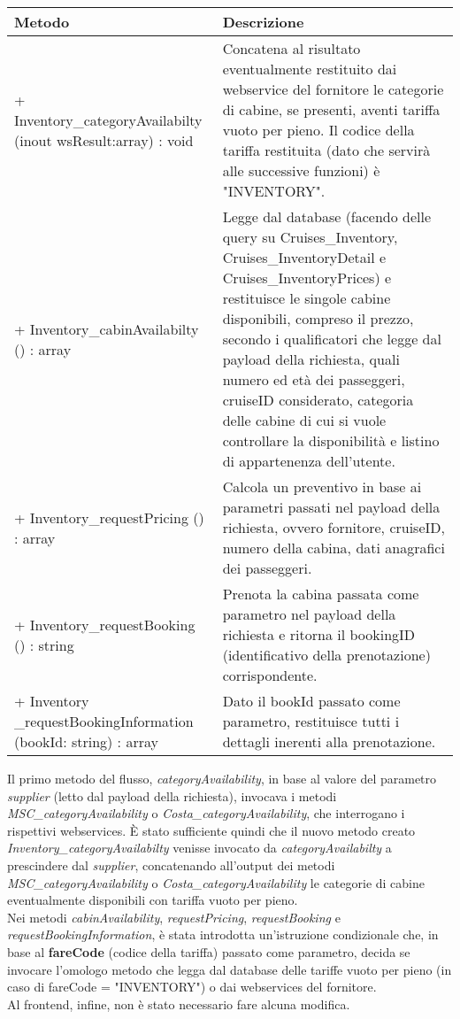 \begin{center}
	\def\arraystretch{1.5}
	\begin{longtable}{ >{\raggedright}p{5.5cm} p{6.8cm}} 
		\hline
		\textbf{Metodo} & \textbf{Descrizione} \\ \hline
		+ Inventory\_categoryAvailabilty (inout wsResult:array) : void & Concatena al risultato eventualmente restituito dai \gls{webservice} del fornitore le categorie di cabine, se presenti, aventi tariffa vuoto per pieno. Il codice della tariffa restituita (dato che servirà alle successive funzioni) è "INVENTORY".\\
		\hline
		+ Inventory\_cabinAvailabilty () : array & Legge dal database (facendo delle query su Cruises\_Inventory, Cruises\_InventoryDetail e Cruises\_InventoryPrices) e restituisce le singole cabine disponibili, compreso il prezzo, secondo i qualificatori che legge dal payload della richiesta, quali numero ed età dei passeggeri, cruiseID considerato, categoria delle cabine di cui si vuole controllare la disponibilità e listino di appartenenza dell'utente.\\
		\hline
		+ Inventory\_requestPricing () : array & Calcola un preventivo in base ai parametri passati nel payload della richiesta, ovvero fornitore, cruiseID, numero della cabina, dati anagrafici dei passeggeri.\\
		\hline
		+ Inventory\_requestBooking () : string & Prenota la cabina passata come parametro nel payload della richiesta e ritorna il bookingID (identificativo della prenotazione) corrispondente.\\
		\hline
		+ Inventory \_requestBookingInformation (bookId: string) : array & Dato il bookId passato come parametro, restituisce tutti i dettagli inerenti alla prenotazione. \\
		\hline
	\end{longtable}
\end{center}
Il primo metodo del flusso, \textit{categoryAvailability}, in base al valore del parametro \textit{supplier} (letto dal payload della richiesta), invocava i metodi \textit{MSC\_categoryAvailability} o \textit{Costa\_categoryAvailability}, che interrogano i rispettivi \glspl{webservice}. È stato sufficiente quindi che il nuovo metodo creato \textit{Inventory\_categoryAvailabilty} venisse invocato da \textit{categoryAvailabilty} a prescindere dal \textit{supplier}, concatenando all'output dei metodi \textit{MSC\_categoryAvailability} o \textit{Costa\_categoryAvailability} le categorie di cabine eventualmente disponibili con tariffa vuoto per pieno.\\
Nei metodi \textit{cabinAvailability}, \textit{requestPricing}, \textit{requestBooking} e \textit{requestBookingInformation}, è stata introdotta un'istruzione condizionale che, in base al \textbf{fareCode} (codice della tariffa) passato come parametro, decida se invocare l'omologo metodo che legga dal database delle tariffe vuoto per pieno (in caso di fareCode = "INVENTORY") o dai \glspl{webservice} del fornitore.\\
Al frontend, infine, non è stato necessario fare alcuna modifica.
